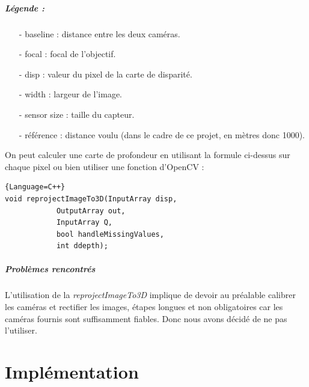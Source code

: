 \documentclass[12pt,a4paper]{report}
\begin{document}
\paragraph{Légende : }
\begin{small}
\begin{enumerate}
\item[-] baseline : distance entre les deux caméras.\\
\item[-] focal : focal de l'objectif.\\
\item[-] disp : valeur du pixel de la carte de disparité.\\
\item[-] width : largeur de l'image.\\
\item[-] sensor size : taille du capteur.\\
\item[-] référence : distance voulu (dans le cadre de ce projet, en mètres donc 1000).\\
\end{enumerate}
\end{small}

On peut calculer une carte de profondeur en utilisant la formule ci-dessus sur chaque pixel ou bien utiliser une fonction d'OpenCV :  

\begin{lstlisting}{Language=C++}
void reprojectImageTo3D(InputArray disp, 
			OutputArray out, 
			InputArray Q, 
			bool handleMissingValues, 
			int ddepth);
\end{lstlisting}

\paragraph{Problèmes rencontrés}
L'utilisation de la \textit{reprojectImageTo3D} implique de devoir au préalable calibrer les caméras et rectifier les images, étapes longues et non obligatoires car les caméras fournis sont suffisamment fiables. Donc nous avons décidé de ne pas l'utiliser.

\chapter{Implémentation}
\end{document}
